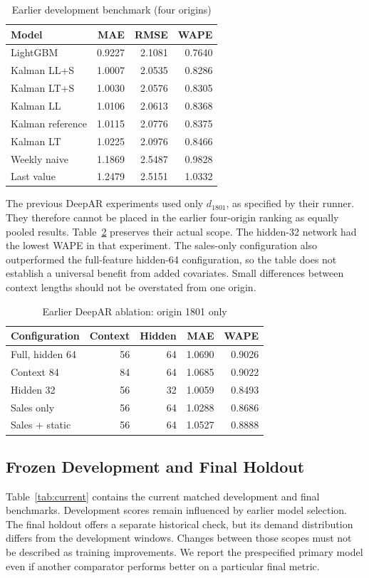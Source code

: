 \documentclass[conference]{IEEEtran}
\begin{document}
\begin{table}[t]\caption{Earlier development benchmark (four origins)}\label{tab:earlier}\centering\footnotesize\begin{tabular}{lrrr}\toprule
Model & MAE & RMSE & WAPE\\\midrule
LightGBM & 0.9227 & 2.1081 & 0.7640\\
Kalman LL+S & 1.0007 & 2.0535 & 0.8286\\
Kalman LT+S & 1.0030 & 2.0576 & 0.8305\\
Kalman LL & 1.0106 & 2.0613 & 0.8368\\
Kalman reference & 1.0115 & 2.0776 & 0.8375\\
Kalman LT & 1.0225 & 2.0976 & 0.8466\\
Weekly naive & 1.1869 & 2.5487 & 0.9828\\
Last value & 1.2479 & 2.5151 & 1.0332\\\bottomrule\end{tabular}\end{table}
The previous DeepAR experiments used only $d_{1801}$, as specified by their runner. They therefore cannot be placed in the earlier four-origin ranking as equally pooled results. Table~\ref{tab:ablation} preserves their actual scope. The hidden-32 network had the lowest WAPE in that experiment. The sales-only configuration also outperformed the full-feature hidden-64 configuration, so the table does not establish a universal benefit from added covariates. Small differences between context lengths should not be overstated from one origin.

\begin{table}[t]\caption{Earlier DeepAR ablation: origin 1801 only}\label{tab:ablation}\centering\footnotesize\begin{tabular}{lrrrr}\toprule
Configuration & Context & Hidden & MAE & WAPE\\\midrule
Full, hidden 64 & 56 & 64 & 1.0690 & 0.9026\\
Context 84 & 84 & 64 & 1.0685 & 0.9022\\
Hidden 32 & 56 & 32 & 1.0059 & 0.8493\\
Sales only & 56 & 64 & 1.0288 & 0.8686\\
Sales + static & 56 & 64 & 1.0527 & 0.8888\\\bottomrule\end{tabular}\end{table}
\subsection{Frozen Development and Final Holdout}
Table~\ref{tab:current} contains the current matched development and final benchmarks. Development scores remain influenced by earlier model selection. The final holdout offers a separate historical check, but its demand distribution differs from the development windows. Changes between those scopes must not be described as training improvements. We report the prespecified primary model even if another comparator performs better on a particular final metric.
\end{document}
